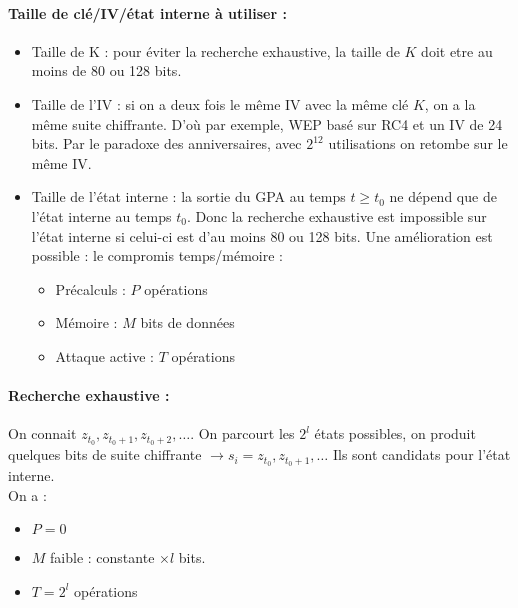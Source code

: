 \documentclass[12pt,a4paper]{report}
\begin{document}
\paragraph{Taille de clé/IV/état interne à utiliser :}
\begin{itemize}
\item Taille de K : pour éviter la recherche exhaustive, la taille de $K$ doit etre au moins de 80 ou 128 bits.
\item Taille de l'IV : si on a deux fois le même IV avec la même clé $K$, on a la même suite chiffrante. D'où par exemple, WEP basé sur RC4 et un IV de 24 bits. Par le paradoxe des anniversaires, avec $2^{12}$ utilisations on retombe sur le même IV.
\item Taille de l'état interne : la sortie du GPA au temps $t \geqslant t_0$ ne dépend que de l'état interne au temps $t_0$. Donc la recherche exhaustive est impossible sur l'état interne si celui-ci est d'au moins 80 ou 128 bits. Une amélioration est possible : le compromis temps/mémoire :
\begin{itemize}
\item Précalculs : $P$ opérations
\item Mémoire : $M$ bits de données
\item Attaque active : $T$ opérations
\end{itemize}
\end{itemize}

\paragraph{Recherche exhaustive :\\}
On connait $z_{t_0}, z_{t_0+1}, z_{t_0+2}, \ldots $. On parcourt les $2^l$ états possibles, on produit quelques bits de suite chiffrante $ \rightarrow s_i = z_{t_0}, z_{t_0+1},\ldots$ Ils sont candidats pour l'état interne.\\
On a :
\begin{itemize}
\item $P=0$
\item $M$ faible : constante $\times l$ bits.
\item $T = 2^l$ opérations
\end{itemize}
\end{document}
